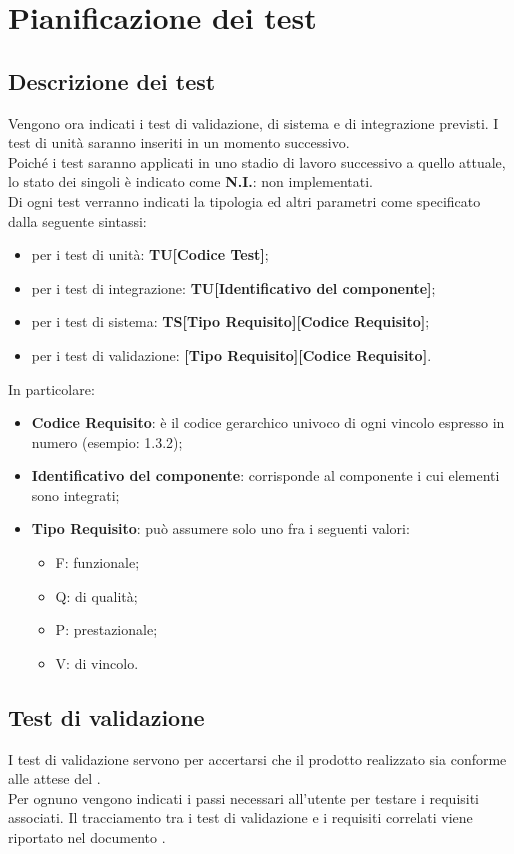 \section{Pianificazione dei test}
	\subsection{Descrizione dei test}
		Vengono ora indicati i test di validazione, di sistema e di integrazione previsti. I test di unità saranno inseriti in un momento successivo. \\
		Poiché i test saranno applicati in uno stadio di lavoro successivo a quello attuale, lo stato dei singoli è indicato come \textbf{N.I.}: non implementati. \\
		Di ogni test verranno indicati la tipologia ed altri parametri come specificato dalla seguente sintassi:
		\begin{itemize}
			\item per i test di unità: \textbf{TU[Codice Test]};
			\item per i test di integrazione: \textbf{TU[Identificativo del componente]};
			\item per i test di sistema: \textbf{TS[Tipo Requisito][Codice Requisito]};
			\item per i test di validazione: \textbf{[Tipo Requisito][Codice Requisito]}.
		\end{itemize}
		In particolare:
		\begin{itemize}
			\item \textbf{Codice Requisito}: è il codice gerarchico univoco di ogni vincolo espresso in numero (esempio: 1.3.2);
			\item \textbf{Identificativo del componente}: corrisponde al componente i cui elementi sono integrati;
			\item \textbf{Tipo Requisito}: può assumere solo uno fra i seguenti valori:
			\begin{itemize}
				\item F: funzionale;
				\item Q: di qualità;
				\item P: prestazionale;
				\item V: di vincolo.
			\end{itemize}
		\end{itemize}
	\subsection{Test di validazione}
		I test di validazione servono per accertarsi che il prodotto realizzato sia conforme alle attese del \PROPONENTE. \\
		Per ognuno vengono indicati i passi necessari all'utente per testare i requisiti associati. Il tracciamento tra i test di validazione e i requisiti correlati viene riportato nel documento \ARdoc.
